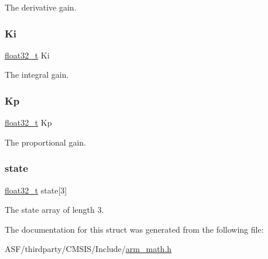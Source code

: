 The derivative gain. \mbox{\label{structarm__pid__instance__f32_ad1a1aa1c10a2dca201a3422f82198777}} 
\subsubsection{\texorpdfstring{Ki}{Ki}}
{\footnotesize\ttfamily \mbox{\hyperlink{arm__math_8h_a4611b605e45ab401f02cab15c5e38715}{float32\+\_\+t}} Ki}

The integral gain. \mbox{\label{structarm__pid__instance__f32_abe23f3e122ef5f55398fcf77c793c425}} 
\subsubsection{\texorpdfstring{Kp}{Kp}}
{\footnotesize\ttfamily \mbox{\hyperlink{arm__math_8h_a4611b605e45ab401f02cab15c5e38715}{float32\+\_\+t}} Kp}

The proportional gain. \mbox{\label{structarm__pid__instance__f32_a473556ac6100fc188e77930d56f51062}} 
\subsubsection{\texorpdfstring{state}{state}}
{\footnotesize\ttfamily \mbox{\hyperlink{arm__math_8h_a4611b605e45ab401f02cab15c5e38715}{float32\+\_\+t}} state\mbox{[}3\mbox{]}}

The state array of length 3. 

The documentation for this struct was generated from the following file\+:\begin{DoxyCompactItemize}
\item 
A\+S\+F/thirdparty/\+C\+M\+S\+I\+S/\+Include/\mbox{\hyperlink{arm__math_8h}{arm\+\_\+math.\+h}}\end{DoxyCompactItemize}
